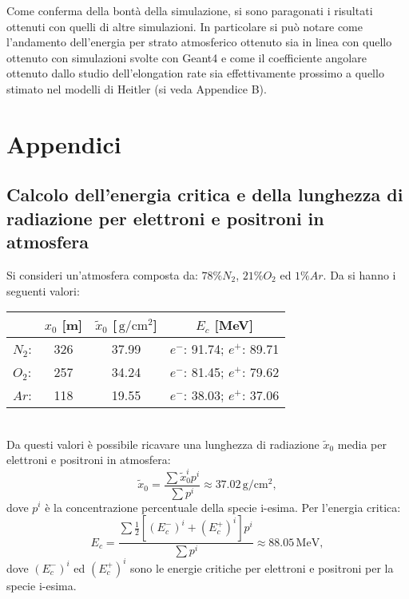 \documentclass[10pt,a4paper,usenatbib]{article}
\newcommand*{\unit}[1]{\ensuremath{\mathrm{\,#1}}}                              %
\begin{document}
Come conferma della bontà della simulazione, si sono paragonati i risultati ottenuti con quelli di altre simulazioni. In particolare si può notare come l'andamento dell'energia per strato atmosferico ottenuto sia in linea con quello ottenuto con simulazioni svolte con Geant4 e come il coefficiente angolare ottenuto dallo studio dell'elongation rate sia effettivamente prossimo a quello stimato nel modelli di Heitler (si veda Appendice B). 


\pagebreak
\appendix
\section{Appendici}
\subsection{Calcolo dell'energia critica e della lunghezza di radiazione per elettroni e positroni in atmosfera}
\label{appendix:a}
Si consideri un'atmosfera composta da: $78\% N_2$, $21\% O_2$ ed $1\% Ar$. Da \cite{Olive:2016xmw} si hanno i seguenti valori: 
\begin{table}[h!]
\centering
\begin{tabular}{lccc}
\toprule
                      &   $x_0$ [m]   &   $\tilde{x}_0$ [$\unit{g/cm^2}$]   &   $E_c$ [MeV]                  \\                          
\midrule
$N_2$:          &   326              &   37.99                               &  $e^-$: 91.74; $e^+$: 89.71        \\
$O_2$:          &   257              &   34.24                               &  $e^-$: 81.45; $e^+$: 79.62         \\
$Ar$:             &   118              &   19.55                               &  $e^-$: 38.03; $e^+$: 37.06          \\
\bottomrule
\end{tabular}
\end{table}
\\Da questi valori è possibile ricavare una lunghezza di radiazione $\tilde{x}_0$ media per elettroni e positroni in atmosfera: \\
\begin{equation*}
\tilde{x}_0 = \frac{\sum\tilde{x}_0^i p^i}{\sum p^i} \approx 37.02\unit{g/cm^2},
\end{equation*}
dove $p^i$ è la concentrazione percentuale della specie i-esima. Per l'energia critica:
\begin{equation*}
E_c = \frac{\sum \frac 1 2 {\left[\left(E_c^-\right)^i + \left(E_c^+\right)^i\right]} p^i}{\sum p^i} \approx 88.05\unit{MeV},
\end{equation*}
dove $\left(E_c^-\right)^i$ ed $\left(E_c^+\right)^i$ sono le energie critiche per elettroni e positroni per la specie i-esima.
\end{document}
